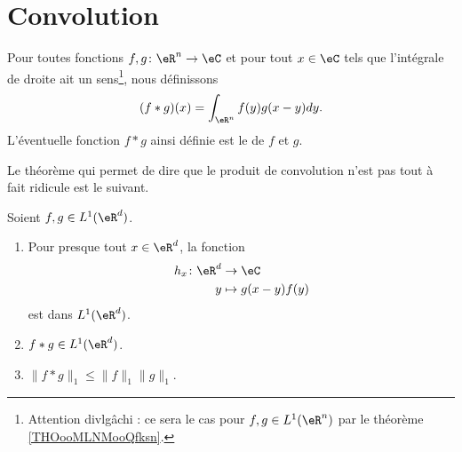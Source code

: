 \section{Convolution}


\begin{definition}      \label{DEFooHHCMooHzfStu}
	Pour toutes fonctions \( f,g\colon \eR^n\to \eC\) et pour tout \( x\in \eC\) tels que l'intégrale de droite ait un sens\footnote{Attention divlgâchi : ce sera le cas pour \( f,g\in L^1(\eR^n)\) par le théorème \ref{THOooMLNMooQfksn}.}, nous définissons
	\begin{equation}
		(f*g)(x)=\int_{\eR^n} f(y)g(x-y)dy.
	\end{equation}
	L'éventuelle fonction \( f*g\) ainsi définie est le  de \( f\) et \( g\).
\end{definition}

Le théorème qui permet de dire que le produit de convolution n'est pas tout à fait ridicule est le suivant.

\begin{theorem}     \label{THOooMLNMooQfksn}
	Soient \( f,g\in L^1(\eR^d)\).
	\begin{enumerate}
		\item
		      Pour presque tout \( x\in \eR^d\), la fonction
		      \begin{equation}
			      \begin{aligned}
				      h_x\colon \eR^d & \to \eC            \\
				      y               & \mapsto g(x-y)f(y)
			      \end{aligned}
		      \end{equation}
		      est dans \( L^1(\eR^d)\).
		\item
		      \( f*g\in L^1(\eR^d)\).
		\item
		      \( \| f*g \|_1\leq \| f \|_1\| g \|_1\).
	\end{enumerate}
\end{theorem}

